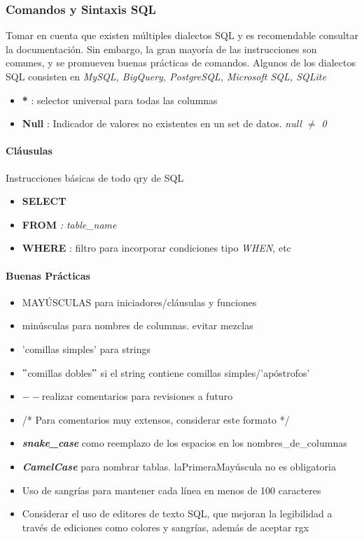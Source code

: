 \subsubsection{Comandos y Sintaxis SQL}
Tomar en cuenta que existen múltiples dialectos SQL y es recomendable consultar la documentación. Sin embargo, la gran mayoría de las instrucciones son comunes, y se promueven buenas prácticas de comandos. Algunos de los dialectos SQL consisten en \textit{MySQL, BigQuery, PostgreSQL, Microsoft SQL, SQLite}
\begin{itemize}
    \item {\textbf{*} : selector universal para todas las columnas}
    \item {\textbf{Null} : Indicador de valores no existentes en un set de datos. \textit{null ${\neq}$ 0}}
\end{itemize}

\paragraph{Cláusulas}
Instrucciones básicas de todo \gls{qry} de SQL
\begin{itemize}
    \item {\textbf{SELECT}}
    \item {\textbf{FROM}\textit{ : table\_name}}
    \item {\textbf{WHERE} : filtro para incorporar condiciones tipo \textit{WHEN}, etc}
\end{itemize}

\paragraph{Buenas Prácticas}
\begin{itemize}
    \item {MAYÚSCULAS para iniciadores/cláusulas y funciones}
    \item {minúsculas para nombres de columnas. evitar mezclas}
    \item {'comillas simples' para strings}
    \item {${"}$comillas dobles${"}$ si el string contiene comillas simples/'apóstrofos'}
    \item {${--}$realizar comentarios para revisiones a futuro}
    \item{/* Para comentarios muy extensos, considerar este formato */}
    \item {\textbf{\textit{snake\_case}} como reemplazo de los espacios en los nombres\_de\_columnas}
    \item {\textbf{\textit{CamelCase}} para nombrar tablas. laPrimeraMayúscula no es obligatoria}
    \item {Uso de sangrías para mantener cada línea en menos de 100 caracteres}
    \item {Considerar el uso de editores de texto SQL, que mejoran la legibilidad a través de ediciones como colores y sangrías, además de aceptar \gls{rgx}}
\end{itemize}


